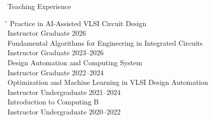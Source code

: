 \begin{rSection}{Teaching Experience}

\begin{tabbing}
\hspace{3.5in}\= \hspace{2.5in}\= \kill
Practice in AI-Assisted VLSI Circuit Design \\
  Instructor \> Graduate \> \hfill {2026} \\
Fundamental Algorithms for Engineering in Integrated Circuits  \\
  Instructor \> Graduate \> \hfill {2023--2026} \\
Design Automation and Computing System \\
  Instructor \> Graduate \> \hfill {2022--2024} \\
Optimization and Machine Learning in VLSI Design Automation \\
  Instructor \> Undergraduate \> \hfill {2021--2024} \\
Introduction to Computing B \\
  Instructor \> Undergraduate \> \hfill {2020--2022} \\
\end{tabbing}

\end{rSection}
